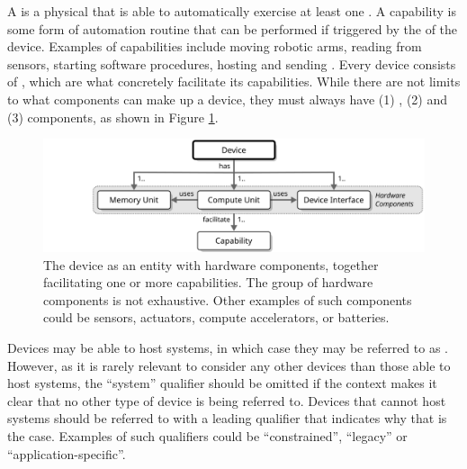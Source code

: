 A  is a physical  that is able to automatically exercise at least one .
A capability is some form of automation routine that can be performed if triggered by the  of the device.
Examples of capabilities include moving robotic arms, reading from sensors, starting software procedures, hosting  and sending . 
Every device consists of , which are what concretely facilitate its capabilities.
While there are not limits to what components can make up a device, they must always have (1) , (2)  and (3)  components, as shown in Figure \ref{fig:device}.

\begin{figure}[ht!]
  \centering
  \includegraphics[scale=0.9]{figures/device}
  \caption{
    The device as an entity with hardware components, together facilitating one or more capabilities.
    The group of hardware components is not exhaustive.
    Other examples of such components could be sensors, actuators, compute accelerators, or batteries.
  }
  \label{fig:device}
\end{figure}

\vspace*{1.8mm}

Devices may be able to host systems, in which case they may be referred to as .
However, as it is rarely relevant to consider any other devices than those able to host systems, the ``system'' qualifier should be omitted if the context makes it clear that no other type of device is being referred to.
Devices that cannot host systems should be referred to with a leading qualifier that indicates why that is the case.
Examples of such qualifiers could be ``constrained'', ``legacy'' or ``application-specific''.


